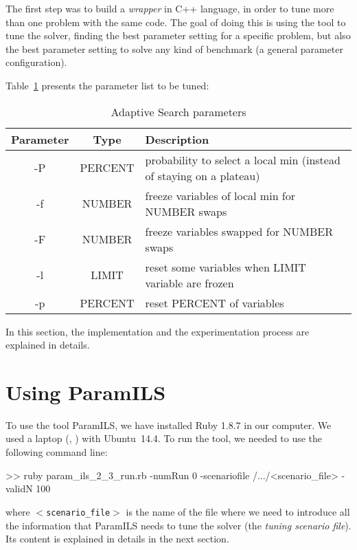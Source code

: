 The first step was to build a {\it wrapper} in C++ language, in order to tune more than one problem with the same code. The goal of doing this is using the tool to tune the solver, \ie finding the best parameter setting for a specific problem, but also the best parameter setting to solve any kind of benchmark (a general parameter configuration).

\nocite{Rickard}

Table~\ref{table:param} presents the parameter list to be tuned:

\begin{table}[ht] 
\centering 
\begin{tabular}{c c l}
\hline\hline
Parameter & Type & Description \\ [0.5ex]
\hline
-P & PERCENT & probability to select a local min (instead of staying on a plateau) \\
-f & NUMBER & freeze variables of local min for NUMBER swaps \\ 
-F & NUMBER & freeze variables swapped for NUMBER swaps \\ 
-l & LIMIT & reset some variables when LIMIT variable are frozen \\ 
-p & PERCENT & reset PERCENT of variables \\ [1ex]
\hline
\end{tabular} 
\caption{Adaptive Search parameters}
\label{table:param}
\end{table} 

In this section, the implementation and the experimentation process are explained in details.

\section{Using ParamILS}

To use the tool {\sc ParamILS}, we have installed Ruby 1.8.7 in our computer. We used a laptop \mylaptopName (\mylaptopProc, \mylaptopMemo) with {\sc Ubuntu~14.4}. To run the tool, we needed to use the following command line:

\begin{BGVerbatim}
>> ruby param_ils_2_3_run.rb -numRun 0 -scenariofile /.../<scenario_file> -validN 100
\end{BGVerbatim}

where \texttt{$<$scenario\_file$>$} is the name of the file where we need to introduce all the information that {\sc ParamILS} needs to tune the solver (the \textit{tuning scenario file}). Its content is explained in details in the next section.

